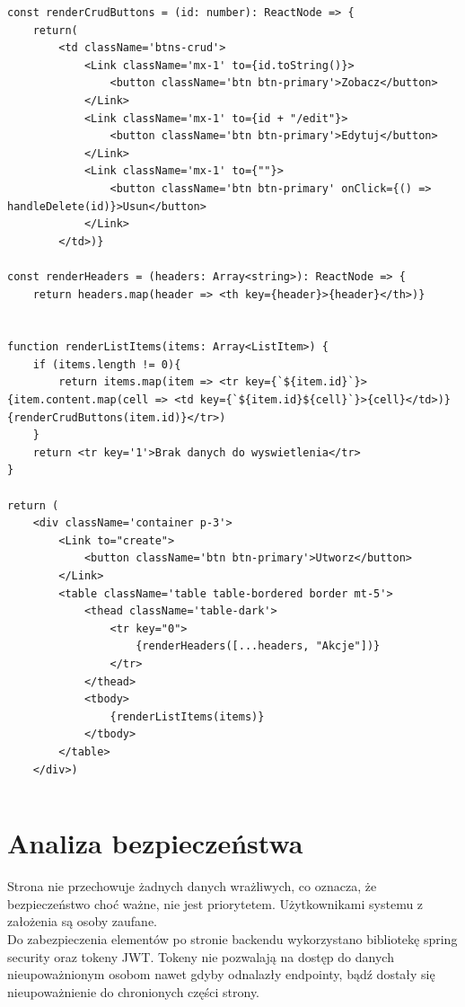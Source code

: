 \documentclass[12pt]{article}
\begin{document}
\begin{lstlisting}
const renderCrudButtons = (id: number): ReactNode => {
    return(
        <td className='btns-crud'>
            <Link className='mx-1' to={id.toString()}>
                <button className='btn btn-primary'>Zobacz</button>
            </Link>
            <Link className='mx-1' to={id + "/edit"}>
                <button className='btn btn-primary'>Edytuj</button>
            </Link>
            <Link className='mx-1' to={""}>
                <button className='btn btn-primary' onClick={() => handleDelete(id)}>Usun</button>
            </Link>
        </td>)}

const renderHeaders = (headers: Array<string>): ReactNode => {
    return headers.map(header => <th key={header}>{header}</th>)}
    

function renderListItems(items: Array<ListItem>) {
    if (items.length != 0){
        return items.map(item => <tr key={`${item.id}`}>{item.content.map(cell => <td key={`${item.id}${cell}`}>{cell}</td>)}{renderCrudButtons(item.id)}</tr>)
    }
    return <tr key='1'>Brak danych do wyswietlenia</tr>
}
    
return (
    <div className='container p-3'>
        <Link to="create">
            <button className='btn btn-primary'>Utworz</button>
        </Link>
        <table className='table table-bordered border mt-5'>
            <thead className='table-dark'>
                <tr key="0">
                    {renderHeaders([...headers, "Akcje"])}
                </tr>
            </thead>
            <tbody>
                {renderListItems(items)}
            </tbody>
        </table>
    </div>)
\end{lstlisting}
\begin{lstlisting}
\end{lstlisting}
\section{Analiza bezpieczeństwa}
Strona nie przechowuje żadnych danych wrażliwych, co oznacza, że bezpieczeństwo choć ważne, nie jest priorytetem. Użytkownikami systemu z założenia są osoby zaufane.
\\

Do zabezpieczenia elementów po stronie backendu wykorzystano bibliotekę spring security oraz tokeny JWT. Tokeny nie pozwalają na dostęp do danych nieupoważnionym osobom nawet gdyby odnalazły endpointy, bądź dostały się nieupoważnienie do chronionych części strony.
\\
\end{document}
